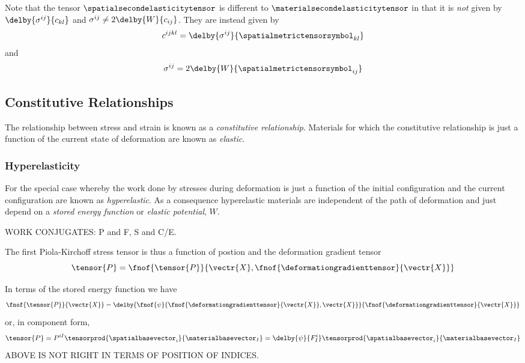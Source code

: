 Note that the tensor $\spatialsecondelasticitytensor$ is different to $\materialsecondelasticitytensor$ in that
it is \emph{not} given by $\delby{\sigma^{ij}}{c_{kl}}$ and $\sigma^{ij}\neq
2\delby{W}{c_{ij}}$. They are instead given by
\begin{equation}
  c^{ijkl}=\delby{\sigma^{ij}}{\spatialmetrictensorsymbol_{kl}}
\end{equation}
and
\begin{equation}
  \sigma^{ij}=2\delby{W}{\spatialmetrictensorsymbol_{ij}}
\end{equation}

\subsection{Constitutive Relationships}

The relationship between stress and strain is known as a \emph{constitutive
  relationship}. Materials for which the constitutive relationship is just a
function of the current state of deformation are known as \emph{elastic}.

\subsubsection{Hyperelasticity}

For the special case whereby the work done by stresses during deformation is
just a function of the initial configuration and the current configuration are
known as \emph{hyperelastic}. As a consequence hyperelastic materials are
independent of the path of deformation and just depend on a \emph{stored
  energy function} or \emph{elastic potential}, $W$.

WORK CONJUGATES: P and F, S and C/E.

The first Piola-Kirchoff stress tensor is thus a function of postion and the
deformation gradient tensor \ie
\begin{equation}
  \tensor{P}=\fnof{\tensor{P}}{\vectr{X},\fnof{\deformationgradienttensor}{\vectr{X}}}
\end{equation}

In terms of the stored energy function we have
\begin{equation}
  \fnof{\tensor{P}}{\vectr{X}}=\delby{\fnof{\psi}{\fnof{\deformationgradienttensor}{\vectr{X}},\vectr{X}}}{\fnof{\deformationgradienttensor}{\vectr{X}}}
\end{equation}
or, in component form,
\begin{equation}
  \tensor{P}=P^{iI}\tensorprod{\spatialbasevector_{i}}{\materialbasevector_{I}}=\delby{\psi}{F^{i}_{I}}\tensorprod{\spatialbasevector_{i}}{\materialbasevector_{I}}
\end{equation}
ABOVE IS NOT RIGHT IN TERMS OF POSITION OF INDICES.

